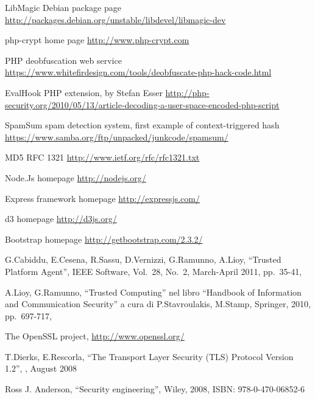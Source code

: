 \begin{thebibliography}{99}
LibMagic Debian package page
\url{http://packages.debian.org/unstable/libdevel/libmagic-dev}

php-crypt home page
\url{http://www.php-crypt.com}

PHP deobfuscation web service
\url{https://www.whitefirdesign.com/tools/deobfuscate-php-hack-code.html}

EvalHook PHP extension, by Stefan Esser
\url{http://php-security.org/2010/05/13/article-decoding-a-user-space-encoded-php-script}

SpamSum spam detection system, first example of context-triggered hash
\url{https://www.samba.org/ftp/unpacked/junkcode/spamsum/}

MD5 RFC 1321
\url{http://www.ietf.org/rfc/rfc1321.txt}

Node.Js homepage
\url{http://nodejs.org/}

Express framework homepage
\url{http://expressjs.com/}

d3 homepage
\url{http://d3js.org/}

Bootstrap homepage
\url{http://getbootstrap.com/2.3.2/}


G.Cabiddu, E.Cesena, R.Sassu, D.Vernizzi, G.Ramunno, A.Lioy,  %
``Trusted Platform Agent'', %
IEEE Software, %
Vol.\ 28, No.\ 2, %
March-April 2011, %
pp.\ 35-41, %


A.Lioy, G.Ramunno, %
``Trusted Computing'' %
nel libro %
``Handbook of Information and Communication Security'' %
a cura di %
P.Stavroulakis, M.Stamp, %
Springer, %
2010, %
pp.\ 697-717, %

The OpenSSL project, %
\url{http://www.openssl.org/} %

T.Dierks, E.Rescorla,
``The Transport Layer Security (TLS) Protocol Version 1.2'',
, August 2008

Ross J. Anderson,
``Security engineering'',
Wiley, 2008,
ISBN: 978-0-470-06852-6


\end{thebibliography}
